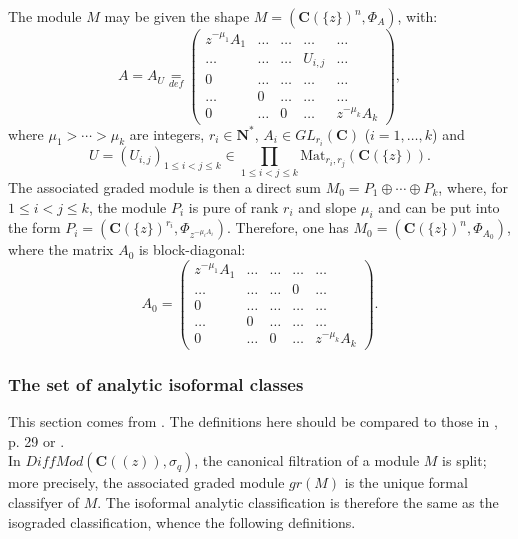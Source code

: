 \documentclass[english]{smfart}
\numberwithin{equation}{thm}
\def\sq{\sigma_q}
\def\C{{\mathbf C}}
\def\N{{\mathbf N}}
\def\Ma{{\text{Mat}}}
\def\Ka{{\C(\{z\})}}
\def\Kf{{\C((z))}}
\def\DMf{{DiffMod(\Kf,\sq)}}
\begin{document}
The module $M$ may be given the shape 
$M = (\Ka^{n},\Phi_{A})$, with:
\begin{equation} \label{equation:forme-canonique}
A = A_{U} \underset{def}{=}
\begin{pmatrix}
z^{- \mu_{1}} A_{1}  & \ldots & \ldots & \ldots & \ldots \\
\ldots & \ldots & \ldots  & U_{i,j} & \ldots \\
0      & \ldots & \ldots   & \ldots & \ldots \\
\ldots & 0 & \ldots  & \ldots & \ldots \\
0      & \ldots & 0       & \ldots & z^{- \mu_{k}} A_{k}    
\end{pmatrix},
\end{equation}
where $\mu_{1} > \cdots > \mu_{k}$ are integers,
$r_{i} \in \N^{*}$, $A_{i} \in GL_{r_{i}}(\C)$ ($i = 1,\ldots,k$) and
$$
U = (U_{i,j})_{1 \leq i < j \leq k} \in 
\underset{1 \leq i < j \leq k}{\prod} \Ma_{r_{i},r_{j}}(\Ka).
$$
The associated graded module is then a direct sum
$M_{0} = P_{1} \oplus \cdots \oplus P_{k}$, where,
for $1 \leq i < j \leq k$, the module $P_{i}$ is pure 
of rank $r_{i}$ and slope $\mu_{i}$ and can be put into
the form $P_{i} = (\Ka^{r_{i}},\Phi_{z^{-\mu_{i} A_{i}}})$.
Therefore, one has $M_{0} = (\Ka^{n},\Phi_{A_{0}})$, where
the matrix $A_{0}$ is block-diagonal:
\begin{equation} \label{equation:forme-canonique-diagonale}
A_{0} =
\begin{pmatrix}
z^{- \mu_{1}} A_{1}  & \ldots & \ldots & \ldots & \ldots \\
\ldots & \ldots & \ldots  & 0 & \ldots \\
0      & \ldots & \ldots   & \ldots & \ldots \\
\ldots & 0 & \ldots  & \ldots & \ldots \\
0      & \ldots & 0       & \ldots & z^{- \mu_{k}} A_{k}    
\end{pmatrix}.
\end{equation}


\subsubsection*{The set of analytic isoformal classes}

This section comes from \cite{RSZ}. The definitions here should
be compared to those in \cite{Varadarajan}, p. 29 or \cite{BV}. \\

In $\DMf$, the canonical filtration of a module $M$ is split; 
more precisely, the associated graded module $gr(M)$ is the unique 
formal classifyer of $M$. The isoformal analytic classification is
therefore the same as the isograded classification, whence the
following definitions.
\end{document}

